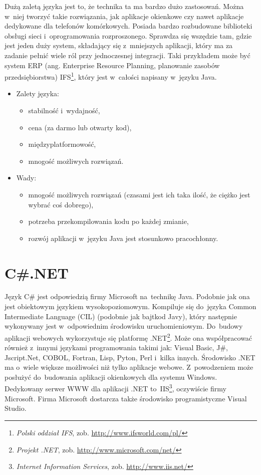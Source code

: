 \documentclass[a4paper,12pt,oneside]{report}
\begin{document}
Dużą zaletą języka jest to, że technika ta ma bardzo dużo zastosowań. Można w~niej tworzyć takie rozwiązania, jak aplikacje okienkowe czy nawet aplikacje dedykowane dla telefonów komórkowych. Posiada bardzo rozbudowane biblioteki obsługi sieci i~oprogramowania rozproszonego. Sprawdza się wszędzie tam, gdzie jest jeden duży system, składający się z~mniejszych aplikacji, który ma za zadanie pełnić wiele ról przy jednoczesnej integracji. Taki przykładem może być system ERP (ang. Enterprise Resource Planning, planowanie zasobów przedsiębiorstwa) IFS\footnote{\emph{Polski oddział IFS}, zob. \url{http://www.ifsworld.com/pl/}}, który jest w~całości napisany w~języku Java.
\begin{itemize}
\item Zalety języka:
  \begin{itemize}
  \item stabilność i~wydajność,
  \item cena (za darmo lub otwarty kod),
  \item międzyplatformowość,
  \item mnogość możliwych rozwiązań.
  \end{itemize}
\item Wady:
  \begin{itemize}
  \item mnogość możliwych rozwiązań (czasami jest ich taka ilość, że ciężko jest wybrać coś dobrego),
  \item potrzeba przekompilowania kodu po każdej zmianie,
  \item rozwój aplikacji w~języku Java jest stosunkowo pracochłonny.
  \end{itemize}
\end{itemize}

\section{C\#.NET}
\label{sec:dotnet}
Język C\# jest odpowiedzią firmy Microsoft na~technikę Java. Podobnie jak ona jest obiektowym językiem wysokopoziomowym. Kompiluje się do~języka Common Intermediate Language (CIL) (podobnie jak bajtkod Javy), który następnie wykonywany jest w~odpowiednim środowisku uruchomieniowym. Do~budowy aplikacji webowych wykorzystuje się platformę .NET\footnote{\emph{Projekt .NET}, zob. \url{http://www.microsoft.com/net/}}. Może ona współpracować również z~innymi językami programowania takimi jak: Visual Basic, J\#, Jscript.Net, COBOL, Fortran, Lisp, Pyton, Perl i~kilka innych. Środowisko .NET ma o~wiele większe możliwości niż tylko aplikacje webowe. Z~powodzeniem może posłużyć do~budowania aplikacji okienkowych dla systemu Windows. Dedykowany serwer WWW dla aplikacji .NET to~IIS\footnote{\emph{Internet Information Services}, zob. \url{http://www.iis.net/}}, oczywiście firmy Microsoft. Firma Microsoft dostarcza także środowisko programistyczne Visual Studio.
\end{document}

